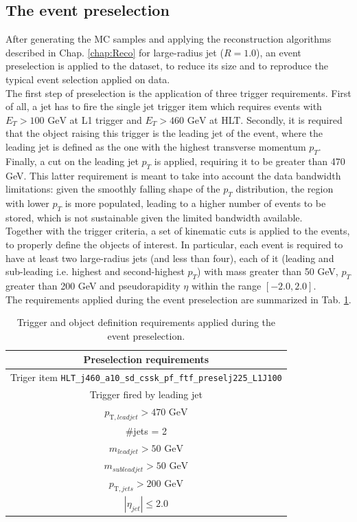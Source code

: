 \subsection{The event preselection}\label{sec:ADJJ/dataset/evSel}
After generating the MC samples and applying the reconstruction algorithms described in Chap. \ref{chap:Reco} for large-radius jet ($R=1.0$), an event preselection is applied to the dataset, to reduce its size and to reproduce the typical event selection applied on data.\\
The first step of preselection is the application of three trigger requirements.
First of all, a jet has to fire the single jet trigger item which requires events with $E_T>100 \text{ GeV}$ at L1 trigger and $E_T>460 \text{ GeV}$ at HLT.
Secondly, it is required that the object raising this trigger is the leading jet of the event, where the leading jet is defined as the one with the highest transverse momentum $p_T$.
Finally, a cut on the leading jet $p_T$ is applied, requiring it to be greater than 470 GeV.
This latter requirement is meant to take into account the data bandwidth limitations: given the smoothly falling shape of the $p_T$ distribution, the region with lower $p_T$ is more populated, leading to a higher number of events to be stored, which is not sustainable given the limited bandwidth available.\\
Together with the trigger criteria, a set of kinematic cuts is applied to the events, to properly define the objects of interest.
In particular, each event is required to have at least two large-radius jets (and less than four), each of it (leading and sub-leading i.e. highest and second-highest $p_T$) with mass greater than 50 GeV, $p_T$ greater than 200 GeV and pseudorapidity $\eta$ within the range $[-2.0, 2.0]$.\\
The requirements applied during the event preselection are summarized in Tab. \ref{tab:ADJJ/dataset/evSel/preselection}.


\begin{table}[htbp]
\centering
\begin{tabular}{|c|}
\hline
\rowcolor{lightgray}
\textbf{Preselection requirements} \\
\hline\hline
Triger item  \texttt{HLT\_j460\_a10\_sd\_cssk\_pf\_ftf\_preselj225\_L1J100}     \\
\hline
Trigger fired by leading jet       \\
\hline
$p_{\text{T}, lead jet} > 470\text{ GeV}$       \\
\hline
 \#jets = 2        \\
\hline
$m_{lead jet}   > 50\text{ GeV}$       \\
\hline
$m_{sublead jet}   > 50\text{ GeV}$         \\
\hline
$p_{\text{T}, jets} > 200\text{ GeV}$            \\
\hline
$|\eta_{ jet}| \le 2.0$        \\
\hline
\end{tabular}
\caption{Trigger and object definition requirements applied during the event preselection.}
\label{tab:ADJJ/dataset/evSel/preselection}
\end{table}

